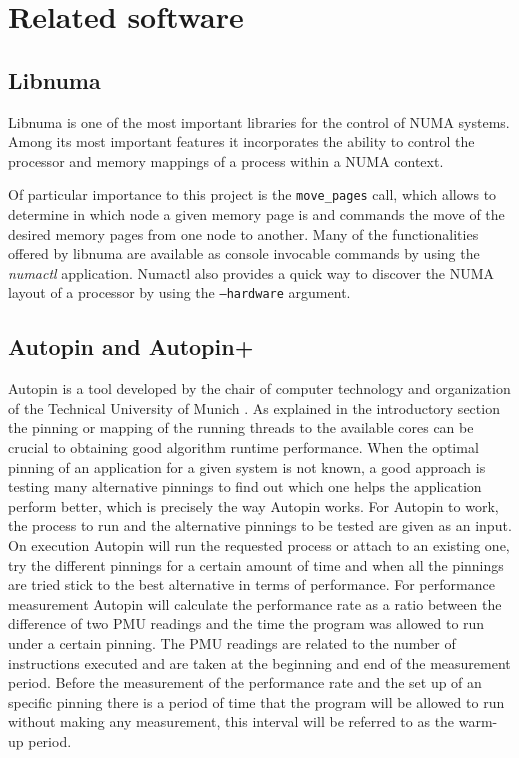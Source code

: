 \section{Related software}\label{section:relatedsw}

\subsection{Libnuma}\label{subsection:libnuma}

Libnuma \cite{libnuma} is one of the most important libraries for the control of NUMA systems. Among its most important features it incorporates the ability to control the processor and memory mappings of a process within a NUMA context.

Of particular importance to this project is the \texttt{move\_pages} call, which allows to determine in which node a given memory page is and commands the move of the desired memory pages from one node to another. Many of the functionalities offered by libnuma are available as console invocable commands by using the \textit{numactl} application. Numactl also provides a quick way to discover the NUMA layout of a processor by using the \texttt{--hardware} argument.

\subsection{Autopin and Autopin+}\label{subsection:autopin2}
Autopin is a tool developed by the chair of computer technology and organization of the Technical University of Munich \cite{autopin}. As explained in the introductory section the pinning or mapping of the running threads to the available cores can be crucial to obtaining good algorithm runtime performance. When the optimal pinning of an application for a given system is not known, a good approach is testing many alternative pinnings to find out which one helps the application perform better, which is precisely the way Autopin works.
For Autopin to work, the process to run and the alternative pinnings to be tested are given as an input. On execution Autopin will run the requested process or attach to an existing one, try the different pinnings for a certain amount of time and when all the pinnings are tried stick to the best alternative in terms of performance. For performance measurement Autopin will calculate the performance rate as a ratio between the difference of two PMU readings and the time the program was allowed to run under a certain pinning. The PMU readings are related to the number of instructions executed and are taken at the beginning and end of the measurement period. Before the measurement of the performance rate and the set up of an specific pinning there is a period of time that the program will be allowed to run without making any measurement, this interval will be referred to as the warm-up period.

